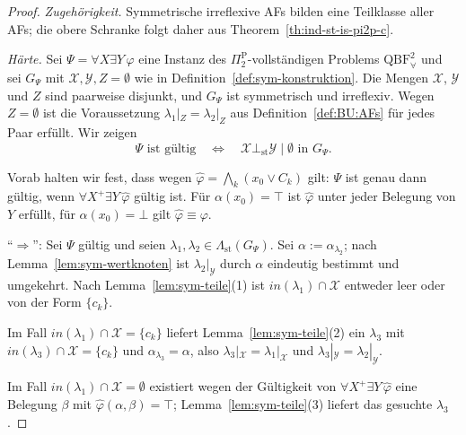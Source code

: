 \begin{proof}
    \emph{Zugehörigkeit.} Symmetrische irreflexive AFs bilden eine Teilklasse
    aller AFs; die obere Schranke folgt daher aus
    Theorem~\ref{th:ind-st-is-pi2p-c}.

    \emph{Härte.} Sei \(\Psi=\forall X\exists Y\,\varphi\) eine Instanz des
    \(\Pi_2^\text{P}\)-vollständigen Problems \(\mathrm{QBF}^2_\forall\) und sei
    \(G_\Psi\) mit \(\mathcal{X},\mathcal{Y},Z=\emptyset\) wie in
    Definition~\ref{def:sym-konstruktion}. Die Mengen \(\mathcal{X}\),
    \(\mathcal{Y}\) und \(Z\) sind paarweise disjunkt, und \(G_\Psi\) ist
    symmetrisch und irreflexiv. Wegen \(Z=\emptyset\) ist die Voraussetzung
    \(\lambda_1|_Z=\lambda_2|_Z\) aus Definition~\ref{def:BU:AFs} für jedes
    Paar erfüllt. Wir zeigen
    \[
        \Psi\text{ ist gültig}
        \quad\Longleftrightarrow\quad
        \mathcal{X}\bot_{\mathrm{st}}\mathcal{Y}\mid\emptyset
        \text{ in }G_\Psi.
    \]

    Vorab halten wir fest, dass wegen
    \(\widehat{\varphi}=\bigwedge_k(x_0\lor C_k)\) gilt:
    \(\Psi\) ist genau dann gültig, wenn
    \(\forall X^{+}\exists Y\,\widehat{\varphi}\) gültig ist. Für
    \(\alpha(x_0)=\top\) ist \(\widehat{\varphi}\) unter jeder Belegung von
    \(Y\) erfüllt, für \(\alpha(x_0)=\bot\) gilt
    \(\widehat{\varphi}\equiv\varphi\).

    \enquote{\(\Rightarrow\)}: Sei \(\Psi\) gültig und seien
    \(\lambda_1,\lambda_2\in\Lambda_{\mathrm{st}}(G_\Psi)\). Sei
    \(\alpha:=\alpha_{\lambda_2}\); nach Lemma~\ref{lem:sym-wertknoten} ist
    \(\lambda_2|_{\mathcal{Y}}\) durch \(\alpha\) eindeutig bestimmt und
    umgekehrt. Nach Lemma~\ref{lem:sym-teile}(1) ist
    \(\mathit{in}(\lambda_1)\cap\mathcal{X}\) entweder leer oder von der Form
    \(\{c_k\}\).

    Im Fall \(\mathit{in}(\lambda_1)\cap\mathcal{X}=\{c_k\}\) liefert
    Lemma~\ref{lem:sym-teile}(2) ein \(\lambda_3\) mit
    \(\mathit{in}(\lambda_3)\cap\mathcal{X}=\{c_k\}\) und
    \(\alpha_{\lambda_3}=\alpha\), also
    \(\lambda_3|_{\mathcal{X}}=\lambda_1|_{\mathcal{X}}\) und
    \(\lambda_3|_{\mathcal{Y}}=\lambda_2|_{\mathcal{Y}}\).

    Im Fall \(\mathit{in}(\lambda_1)\cap\mathcal{X}=\emptyset\) existiert wegen
    der Gültigkeit von \(\forall X^{+}\exists Y\,\widehat{\varphi}\) eine
    Belegung \(\beta\) mit \(\widehat{\varphi}(\alpha,\beta)=\top\);
    Lemma~\ref{lem:sym-teile}(3) liefert das gesuchte \(\lambda_3\).


\end{proof}
